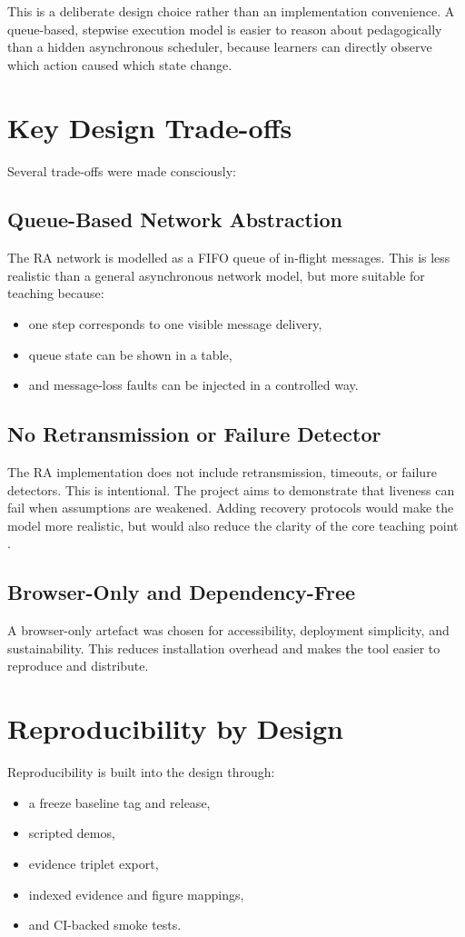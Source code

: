 This is a deliberate design choice rather than an implementation convenience. A queue-based, stepwise execution model is easier to reason about pedagogically than a hidden asynchronous scheduler, because learners can directly observe which action caused which state change.

\section{Key Design Trade-offs}
Several trade-offs were made consciously:

\subsection{Queue-Based Network Abstraction}
The RA network is modelled as a FIFO queue of in-flight messages. This is less realistic than a general asynchronous network model, but more suitable for teaching because:
\begin{itemize}
  \item one step corresponds to one visible message delivery,
  \item queue state can be shown in a table,
  \item and message-loss faults can be injected in a controlled way.
\end{itemize}

\subsection{No Retransmission or Failure Detector}
The RA implementation does not include retransmission, timeouts, or failure detectors. This is intentional. The project aims to demonstrate that liveness can fail when assumptions are weakened. Adding recovery protocols would make the model more realistic, but would also reduce the clarity of the core teaching point \cite{chandra1996failure}.

\subsection{Browser-Only and Dependency-Free}
A browser-only artefact was chosen for accessibility, deployment simplicity, and sustainability. This reduces installation overhead and makes the tool easier to reproduce and distribute.

\section{Reproducibility by Design}
Reproducibility is built into the design through:
\begin{itemize}
  \item a freeze baseline tag and release,
  \item scripted demos,
  \item evidence triplet export,
  \item indexed evidence and figure mappings,
  \item and CI-backed smoke tests.
\end{itemize}

